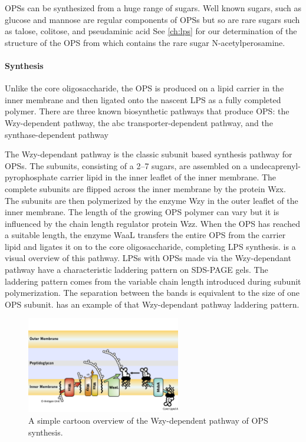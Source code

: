 \Acp{OPS} can be synthesized from a huge range of sugars. Well known sugars,
such as glucose and mannose are regular components of \acp{OPS} but so are rare
sugars such as talose, colitose, and pseudaminic acid
See \cref{ch:lps} for our determination of the structure of the \ac{OPS} from
\caulobacter which contains the rare sugar N-acetylperosamine.

    \paragraph{Synthesis}
    Unlike the core oligosaccharide, the \ac{OPS} is produced on a lipid carrier in the inner membrane and then ligated onto the nascent \ac{LPS} as a fully completed polymer.
 There are three known biosynthetic pathways that produce \ac{OPS}: the Wzy-dependent pathway, the \ac{abc} transporter-dependent pathway, and the synthase-dependent pathway

The Wzy-dependant pathway is the classic subunit based synthesis pathway for \acp{OPS}. The subunits, consisting of a 2--7 sugars, are assembled on a undecaprenyl-pyrophosphate carrier lipid in the inner leaflet of the inner membrane. The complete subunits are flipped across the inner membrane by the protein Wzx. The subunits are then polymerized by the enzyme Wzy in the outer leaflet of the inner membrane. The length of the growing \ac{OPS} polymer can vary but it is influenced by the chain length regulator protein Wzz. When the \ac{OPS} has reached a suitable length, the enzyme WaaL transfers the entire \ac{OPS} from the carrier lipid and ligates it on to the core oligosaccharide, completing \ac{LPS} synthesis.  is a visual overview of this pathway. \Acp{LPS} with \acp{OPS} made via the Wzy-dependant pathway have a characteristic laddering pattern on \ac{SDS-PAGE} gels. The laddering pattern comes from the variable chain length introduced during subunit polymerization. The separation between the bands is equivalent to the size of one \ac{OPS} subunit.  has an example of that Wzy-dependant pathway laddering pattern.

\begin{figure}[htb]
  	\begin{center}
   		\includegraphics[width=0.6\textwidth]{intro/img/lpswzy.pdf}
   	\end{center}
   	\caption[A simple overview of the Wzy-dependent pathway]{
A simple cartoon overview of the Wzy-dependent pathway of \ac{OPS} synthesis.
}
\label{fig:lpswzy}
\end{figure}   

